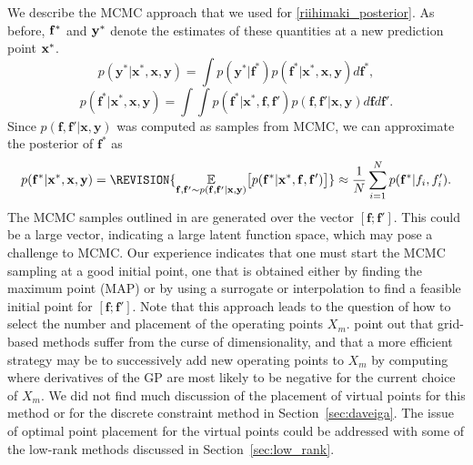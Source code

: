 We describe the MCMC approach that we used for \eqref{riihimaki_posterior}. 
As before, $\bold{f}^*$ and $\bold{y}^*$ denote the estimates of these quantities at a new prediction point $\bold{x}^*$. 
\begin{equation}
p(\mathbf{y}^*|\mathbf{x}^*,\mathbf{x},\mathbf{y}) = \int p(\mathbf{y}^*|\mathbf{f}^*) p(\mathbf{f}^*|\mathbf{x}^*,\mathbf{x},\mathbf{y}) 
d\mathbf{f}^*,
\end{equation}
\begin{equation}
p(\mathbf{f}^*|\mathbf{x}^*,\mathbf{x},\mathbf{y}) = \int \int p(\mathbf{f}^*|\mathbf{x}^*,\mathbf{f},\mathbf{f}')p(\mathbf{f},\mathbf{f}'|\mathbf{x},\mathbf{y}) d\mathbf{f} d\mathbf{f}'.
\end{equation}
Since $p(\mathbf{f},\mathbf{f}'|\mathbf{x},\mathbf{y})$ was computed as samples from MCMC, we can approximate the posterior of $\mathbf{f}^*$ as
\begin{equation}
p(\mathbf{f}^*|\mathbf{x}^*,\mathbf{x},\mathbf{y}) = 
\REVISION{ \underset{\mathbf{f},\mathbf{f}' \sim p(\mathbf{f},\mathbf{f}'|\mathbf{x},\mathbf{y})} {\mathbb{E}}
\big[ p(\mathbf{f}^*|\mathbf{x}^*,\mathbf{f},\mathbf{f}') \big]} \approx \frac{1}{N}\sum_{i=1}^N p(\mathbf{f}^*|f_i,f'_i).
\label{eq:mcmc_monot}
\end{equation}
The MCMC samples outlined in \REVISION{\eqref{eq:mcmc_monot}} are generated over the 
vector $[\mathbf{f}; \mathbf{f}']$.   This could be a large vector, indicating a large latent function space, which may pose a challenge to MCMC.  Our experience indicates that one must start the MCMC sampling at a good initial point, one that is obtained either by finding the maximum  point (MAP) or by using a surrogate or interpolation to find a feasible initial point for $[\mathbf{f};\mathbf{f}']$. 
Note that this approach leads to the question of how to select the number and placement of the operating points $X_m$.  point out that grid-based methods suffer from the curse of dimensionality, and that a more efficient strategy may be to successively add new operating points to $X_m$ by computing where derivatives of the GP are most likely to be negative for the current choice of $X_m$. 
We did not find much discussion of the placement of virtual points for this method or for the discrete constraint method in Section~\ref{sec:daveiga}.  The issue of optimal point placement for the virtual points could be addressed with 
some of the low-rank methods discussed in Section~\ref{sec:low_rank}.

